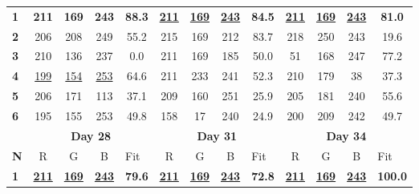 \documentclass[preprint, review, 12pt]{elsarticle}
\begin{document}
\begin{table}[htbp]
{\begin{tabular}{l|cccc|cccc|cccc|}
\multicolumn{1}{|l|}{\textbf{1}} & \textbf{211} & \textbf{169} & \textbf{243} & \textbf{88.3}                   & \underline{\textbf{211}}& \underline{\textbf{169}}& \underline{\textbf{243}}& \textbf{84.5}& \underline{\textbf{211}}& \underline{\textbf{169}}& \underline{\textbf{243}}& \textbf{81.0}\\
\multicolumn{1}{|l|}{\textbf{2}} & 206          & 208          & 249          & 55.2                            & 215          & 169          & 212          & 83.7                     & 218          & 250          & 243          & 19.6                     \\
\multicolumn{1}{|l|}{\textbf{3}} & 210          & 136          & 237          & 0.0                             & 211          & 169          & 185          & 50.0                     & 51           & 168          & 247          & 77.2                     \\
\multicolumn{1}{|l|}{\textbf{4}} & \underline{199}& \underline{154}& \underline{253}& 64.6& 211          & 233          & 241          & 52.3                     & 210          & 179          & 38           & 37.3                     \\
\multicolumn{1}{|l|}{\textbf{5}} & 206          & 171          & 113          & 37.1                            & 209          & 160          & 251          & 25.9                     & 205          & 181          & 240          & 55.6                     \\
\multicolumn{1}{|l|}{\textbf{6}} & 195          & 155          & 253          & 49.8                            & 158          & 17           & 240          & 24.9                     & 200          & 209          & 242          & 49.7                     \\ \hline
                                 & \multicolumn{4}{c|}{\textbf{Day 28}}                                         & \multicolumn{4}{c|}{\textbf{Day 31}}                                  & \multicolumn{4}{c|}{\textbf{Day 34}}                                  \\ \hline
\multicolumn{1}{|l|}{\textbf{N}} & R            & G            & B            & \multicolumn{1}{l|}{Fit}        & R            & G            & B            & \multicolumn{1}{l|}{Fit} & R            & G            & B            & \multicolumn{1}{l|}{Fit} \\ \hline
\multicolumn{1}{|l|}{\textbf{1}} & \underline{\textbf{211}}& \underline{\textbf{169}}& \underline{\textbf{243}}& \textbf{79.6}                  & \underline{\textbf{211}}& \underline{\textbf{169}}& \underline{\textbf{243}}& \textbf{72.8}& \underline{\textbf{211}}& \underline{\textbf{169}}& \underline{\textbf{243}}& \textbf{100.0}          \\

\end{tabular}}
\end{table}
\end{document}
